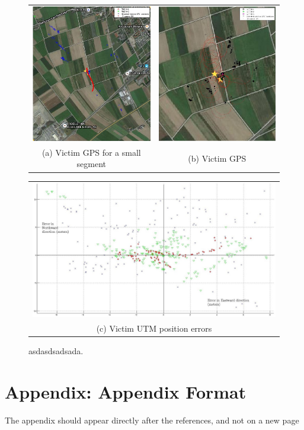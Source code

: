 \documentclass[runningheads]{llncs}
\begin{document}
\begin{figure}
  \centering
  \begin{tabular}{cc}
    \includegraphics[width=6cm]{img/victim_gps/victim_gps_on_map.jpg} &
    \includegraphics[width=6cm]{img/victim_gps/victim_gps_on_map_3.jpg} \\
    \small (a) Victim GPS for a small segment & 
    \small (b) Victim GPS
  \end{tabular}

  \vspace{\floatsep}
  
  \begin{tabular}{c}
    \includegraphics[width=11cm]{img/victim_gps/victim_utm_errors.jpg} \\
    \small (c) Victim UTM position errors
  \end{tabular}

  \caption{asdasdsadsada.}\label{fig:victim_gps}
\end{figure}














\nocite{bal:cha:gra:pae}



\section*{Appendix: Appendix Format}
The appendix should appear directly after the references, and not on a new page
\end{document}
